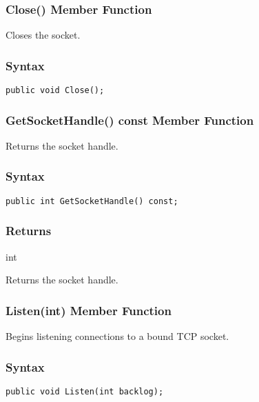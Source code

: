 \documentclass[a4paper,oneside,11.000000pt]{book}
\begin{document}
\hypertarget{System.Net.Sockets.TcpSocket.Close.P.System.Net.Sockets.TcpSocket}{\subsubsection*{Close() Member Function}}\begin{flushleft}
Closes the socket.

\end{flushleft}
\subsubsection*{Syntax}
\texttt{public void Close();}
\clearpage

\hypertarget{System.Net.Sockets.TcpSocket.GetSocketHandle.C.P.System.Net.Sockets.TcpSocket}{\subsubsection*{GetSocketHandle() const Member Function}}\begin{flushleft}
Returns the socket handle.

\end{flushleft}

\subsubsection*{Syntax}\texttt{public int GetSocketHandle() const;}
\subsubsection*{Returns}int
\begin{flushleft}
Returns the socket handle.

\end{flushleft}
\clearpage

\hypertarget{System.Net.Sockets.TcpSocket.Listen.P.System.Net.Sockets.TcpSocket.int}{\subsubsection*{Listen(int) Member Function}}
\begin{flushleft}
Begins listening connections to a bound TCP socket.

\end{flushleft}
\subsubsection*{Syntax}\texttt{public void Listen(int backlog);}
\end{document}
